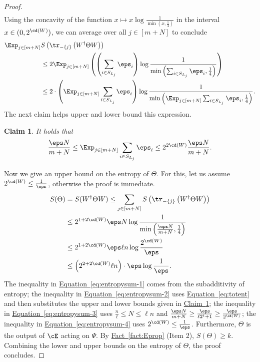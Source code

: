 \documentclass[11pt]{article}
\newcommand{\expref}[2]{\texorpdfstring{\hyperref[#2]{#1~\ref{#2}}}{#1~\ref{#2}}}
\newcommand{\expeqref}[2]{\texorpdfstring{\hyperref[#2]{#1~\eqref{#2}}}{#1~\eqref{#2}}}
\newtheorem{claim}[theorem]{Claim}
\begin{document}
\begin{proof}
\begin{align}
\end{align}
Using the concavity of the function $x \mapsto x\log\frac{1}{\min\left(x,\frac{1}{4}\right)}$ in the interval $x\in (0, 2^{\cd(W)})$, we can average over all $j\in [m+N]$ to conclude
\begin{align}
    \Exp_{j\in [m+N]}&S \left( \tr_{-\{j\}} \left(W^\dagger \Theta W\right) \right) \\
    &\leq  2\Exp_{j\in [m+N]}\left(\left(\sum_{i\in S_{L_j}}\eps_i\right)\log \frac{1}{\min\left(\sum_{i\in S_{L_j}}\eps_i, \frac{1}{4}\right)}\right)\label{eq:totent} \\
    &\leq 2\cdot \left(\Exp_{j\in [m+N]}\sum_{i\in S_{L_j}}\eps_i\right)\log \frac{1}{\min\left(\Exp_{j\in [m+N]}\sum_{i\in S_{L_j}}\eps_i, \frac{1}{4}\right)}. 
\end{align}
The next claim helps upper and lower bound this expression.
\begin{claim}
\label{clm:mostlow}
It holds that 
\begin{align}
\frac{\eps N}{m+N}\leq \Exp_{j\in [m+N]}\sum_{i\in S_{L_j}}\eps_i\leq 2^{2\cd(W)}\frac{\eps N}{m+N}.
\end{align}
\end{claim}
%
Now we give an upper bound on
the entropy of $\Theta$. For this, let us assume $2^{\cd(W)}\leq \frac{1}{\eps}$, 
%
otherwise  %
the proof is immediate. 
\begin{align}
S(\Theta) &= S(W^\dagger \Theta W)\leq \sum_{j \in [m+N]} S\left( \tr_{-\{j\}}\left(W^\dagger \Theta W \right) \right) \label{eq:entropysum-1} \\
&\leq 2^{1+2\cd(W)}\eps N \log \frac{1}{\min\left(\frac{\eps N}{m+N}, \frac{1}{4}\right)} \label{eq:entropysum-2} \\
&\leq
2^{1+2\cd(W)}\eps \ell n \log \frac{2^{\cd(W)}}{\eps} \label{eq:entropysum-3} \\
&\leq \left(2^{2+2\cd(W)}\ell n \right) \cdot \eps \log \frac{1}{\eps}. \label{eq:entropysum-4}
\end{align}
The inequality in \expeqref{Equation}{eq:entropysum-1} comes from the subadditivity of entropy; the inequality in \expeqref{Equation}{eq:entropysum-2} uses \expeqref{Equation}{eq:totent} and then substitutes the upper and lower bounds given in \expref{Claim}{clm:mostlow}; the inequality in \expeqref{Equation}{eq:entropysum-3} uses $ \frac{n}{\ell}\leq N\leq \ell n$ and $\frac{\eps N}{m+N}\geq \frac{\eps}{ \ell 2^{t}+1}\geq  \frac{\eps}{ 2^{\cd(W)}}$; the inequality in \expeqref{Equation}{eq:entropysum-4} uses $2^{\cd(W)}\leq \frac{1}{\eps}$. Furthermore, $\Theta$ is the output of $\cE$ acting on $\Psi$. By \expref{Fact}{fact:Eprop} (Item 2), $S(\Theta) \geq k$. Combining the lower and upper bounds on the entropy of $\Theta$, the proof concludes. 
\end{proof}
\end{document}
